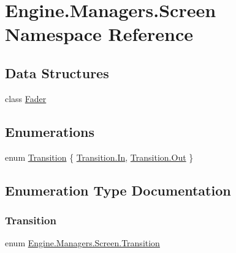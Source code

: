 \hypertarget{a00273}{}\section{Engine.\+Managers.\+Screen Namespace Reference}
\label{a00273}
\subsection*{Data Structures}
\begin{DoxyCompactItemize}
\item 
class \hyperlink{a00534}{Fader}
\end{DoxyCompactItemize}
\subsection*{Enumerations}
\begin{DoxyCompactItemize}
\item 
enum \hyperlink{a00273_a5ba0395c15683984f73feffe79799042}{Transition} \{ \hyperlink{a00273_a5ba0395c15683984f73feffe79799042aefeb369cccbd560588a756610865664c}{Transition.\+In}, 
\hyperlink{a00273_a5ba0395c15683984f73feffe79799042a7c147cda9e49590f6abe83d118b7353b}{Transition.\+Out}
 \}
\end{DoxyCompactItemize}


\subsection{Enumeration Type Documentation}
\mbox{\label{a00273_a5ba0395c15683984f73feffe79799042}} 
\subsubsection{\texorpdfstring{Transition}{Transition}}
{\footnotesize\ttfamily enum \hyperlink{a00273_a5ba0395c15683984f73feffe79799042}{Engine.\+Managers.\+Screen.\+Transition}\hspace{0.3cm}{\ttfamily [strong]}}


